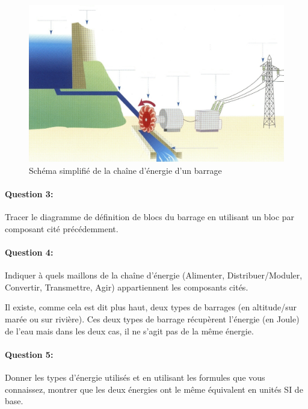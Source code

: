 \begin{figure}[htbp]
\begin{center}
\includegraphics[width=0.9\linewidth]{img/schema_barrage.jpg}
\caption{Schéma simplifié de la chaîne d'énergie d'un barrage}
\label{fig:image6}
\end{center}
\end{figure}


\paragraph{Question 3:}

Tracer le diagramme de définition de blocs du barrage en utilisant un bloc par composant cité précédemment.

\paragraph{Question 4:}

Indiquer à quels maillons de la chaîne d'énergie (Alimenter, Distribuer/Moduler, Convertir, Transmettre, Agir) appartiennent les composants cités.

Il existe, comme cela est dit plus haut, deux types de barrages (en altitude/sur marée ou sur rivière). Ces deux types de barrage récupèrent l'énergie (en Joule) de l'eau mais dans les deux cas, il ne s'agit pas de la même énergie.

\paragraph{Question 5:}

Donner les types d'énergie utilisés et en utilisant les formules que vous connaissez, montrer que les deux énergies ont le même équivalent en unités SI de base.


